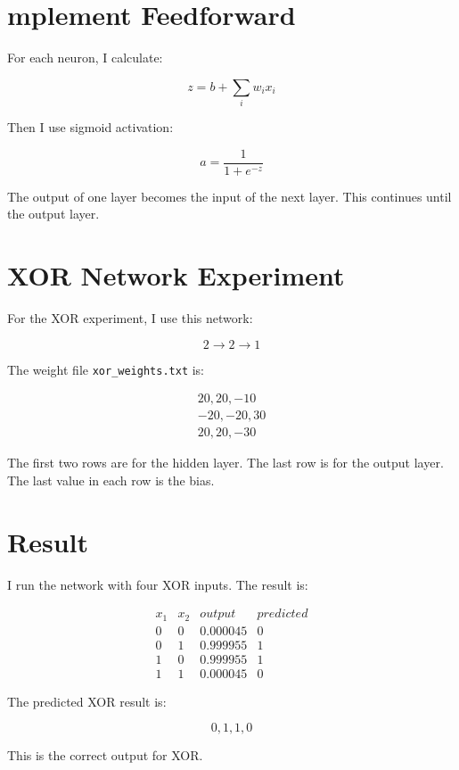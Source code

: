 \documentclass[12pt]{article}
\begin{document}
\section{mplement Feedforward}

For each neuron, I calculate:

\[
z = b + \sum_i w_i x_i
\]

Then I use sigmoid activation:

\[
a = \frac{1}{1 + e^{-z}}
\]

The output of one layer becomes the input of the next layer.
This continues until the output layer.

\section{XOR Network Experiment}

For the XOR experiment, I use this network:

\[
2 \rightarrow 2 \rightarrow 1
\]

The weight file \texttt{xor\_weights.txt} is:

\[
\begin{array}{c}
20, 20, -10 \\
-20, -20, 30 \\
20, 20, -30
\end{array}
\]

The first two rows are for the hidden layer.
The last row is for the output layer.
The last value in each row is the bias.

\section{Result}

I run the network with four XOR inputs.
The result is:

\[
\begin{array}{c|c|c|c}
x_1 & x_2 & output & predicted \\
\hline
0 & 0 & 0.000045 & 0 \\
0 & 1 & 0.999955 & 1 \\
1 & 0 & 0.999955 & 1 \\
1 & 1 & 0.000045 & 0
\end{array}
\]

The predicted XOR result is:

\[
0, 1, 1, 0
\]

This is the correct output for XOR.
\end{document}

